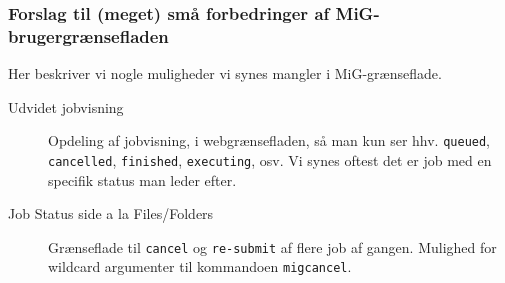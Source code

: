 \documentclass[final,a4paper,11pt]{article}
\newcommand{\mig}{MiG}
\begin{document}
\subsubsection*{Forslag til (meget) små forbedringer af \mig-brugergrænsefladen}

Her beskriver vi nogle muligheder vi synes mangler i \mig-grænseflade.
\begin{description}
	\item[Udvidet jobvisning]
	Opdeling af jobvisning, i webgrænsefladen, så man kun ser hhv. \texttt{queued}, \texttt{cancelled}, \texttt{finished}, \texttt{executing}, osv. Vi synes oftest det er job med en specifik status man leder efter.
	\item[Job Status side a la Files/Folders] 
	Grænseflade til \texttt{cancel} og \texttt{re-submit} af flere job af gangen. Mulighed for wildcard argumenter til kommandoen \texttt{migcancel}.
\end{description}



%





\appendix
\label{kode2222}
\newpage
\end{document}
